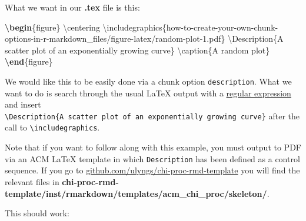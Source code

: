 \documentclass[sigchi, ]{acmart}
\newenvironment{Shaded}{\begin{snugshade}}{\end{snugshade}}
\newcommand{\BuiltInTok}[1]{#1}
\newcommand{\ExtensionTok}[1]{#1}
\newcommand{\FunctionTok}[1]{\textcolor[rgb]{0.00,0.00,0.00}{#1}}
\newcommand{\KeywordTok}[1]{\textcolor[rgb]{0.13,0.29,0.53}{\textbf{#1}}}
\newcommand{\NormalTok}[1]{#1}
\begin{document}
What we want in our \textbf{.tex} file is this:

\begin{Shaded}
\begin{Highlighting}[]
\KeywordTok{\textbackslash{}begin}\NormalTok{\{}\ExtensionTok{figure}\NormalTok{\}}
\FunctionTok{\textbackslash{}centering}
\BuiltInTok{\textbackslash{}includegraphics}\NormalTok{\{}\ExtensionTok{how-to-create-your-own-chunk-options-in-r-markdown_files/figure-latex/random-plot-1.pdf}\NormalTok{\}}
\FunctionTok{\textbackslash{}Description}\NormalTok{\{A scatter plot of an exponentially growing curve\}}
\FunctionTok{\textbackslash{}caption}\NormalTok{\{A random plot\}}
\KeywordTok{\textbackslash{}end}\NormalTok{\{}\ExtensionTok{figure}\NormalTok{\}}
\end{Highlighting}
\end{Shaded}

We would like this to be easily done via a chunk option \texttt{description}. What we want to do is search through the usual LaTeX output with a \href{https://r4ds.had.co.nz/strings.html\#matching-patterns-with-regular-expressions}{regular expression} and insert \texttt{\textbackslash{}Description\{A\ scatter\ plot\ of\ an\ exponentially\ growing\ curve\}} after the call to \texttt{\textbackslash{}includegraphics}.

Note that if you want to follow along with this example, you must output to PDF via an ACM LaTeX template in which \texttt{Description} has been defined as a control sequence. If you go to \href{https://github.com/ulyngs/chi-proc-rmd-template}{github.com/ulyngs/chi-proc-rmd-template} you will find the relevant files in \textbf{chi-proc-rmd-template/inst/rmarkdown/templates/acm\_chi\_proc/skeleton/}.

This should work:
\end{document}
